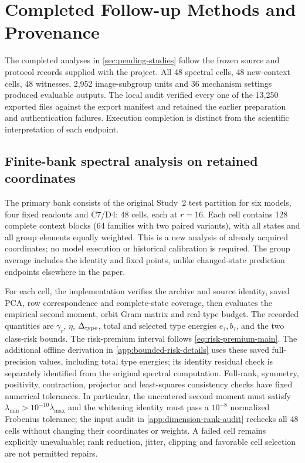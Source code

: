 \section{Completed Follow-up Methods and Provenance}
\label{app:pending-protocols}
The completed analyses in \cref{sec:pending-studies} follow the frozen source and protocol records supplied with the project. All 48 spectral cells, 48 new-context cells, 48 witnesses, 2,952 image-subgroup units and 36 mechanism settings produced evaluable outputs. The local audit verified every one of the 13,250 exported files against the export manifest and retained the earlier preparation and authentication failures. Execution completion is distinct from the scientific interpretation of each endpoint.

\subsection{Finite-bank spectral analysis on retained coordinates}
The primary bank consists of the original Study~2 test partition for six models, four fixed readouts and C7/D4: 48 cells, each at $r=16$. Each cell contains 128 complete context blocks (64 families with two paired variants), with all states and all group elements equally weighted. This is a new analysis of already acquired coordinates; no model execution or historical calibration is required. The group average includes the identity and fixed points, unlike changed-state prediction endpoints elsewhere in the paper.

For each cell, the implementation verifies the archive and source identity, saved PCA, row correspondence and complete-state coverage, then evaluates the empirical second moment, orbit Gram matrix and real-type budget. The recorded quantities are $\gamma_r$, $\eta$, $\Delta_{\rm type}$, total and selected type energies $e_\tau,b_\tau$, and the two class-risk bounds. The risk-premium interval follows \cref{eq:risk-premium-main}. The additional offline derivation in \cref{app:bounded-risk-details} uses these saved full-precision values, including total type energies; its identity residual check is separately identified from the original spectral computation. Full-rank, symmetry, positivity, contraction, projector and least-squares consistency checks have fixed numerical tolerances. In particular, the uncentered second moment must satisfy $\lambda_{\min}>10^{-10}\lambda_{\max}$ and the whitening identity must pass a $10^{-8}$ normalized Frobenius tolerance; the input audit in \cref{app:dimension-rank-audit} rechecks all 48 cells without changing their coordinates or weights. A failed cell remains explicitly unevaluable; rank reduction, jitter, clipping and favorable cell selection are not permitted repairs.

